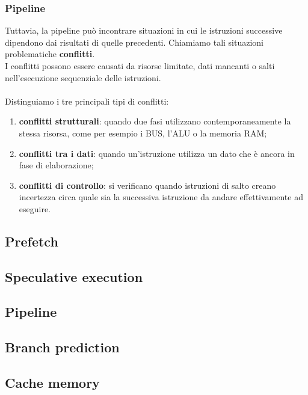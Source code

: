 \begin{frame}
	\frametitle{ Pipeline}

		Tuttavia, la pipeline può incontrare situazioni in cui le istruzioni successive dipendono dai risultati di quelle precedenti. Chiamiamo tali situazioni problematiche \textbf{conflitti}.\\
		I conflitti possono essere causati da risorse limitate, dati mancanti o salti nell'esecuzione sequenziale delle istruzioni.\\~\\		
		Distinguiamo i tre principali tipi di conflitti:
		\begin{enumerate}
			\item \textbf{conflitti strutturali}: quando due fasi utilizzano contemporaneamente la stessa risorsa, come per esempio i BUS, l’ALU o la memoria RAM;
			\item \textbf{conflitti tra i dati}: quando un'istruzione utilizza un dato che è ancora in fase di elaborazione;
			\item \textbf{conflitti di controllo}: si verificano quando istruzioni di salto creano incertezza circa quale sia la successiva istruzione da andare effettivamente ad eseguire.
		\end{enumerate}
		

\end{frame}






\subsection[Prefetch]{Prefetch}
\subsection[Speculative execution]{Speculative execution}
\subsection[Pipeline]{Pipeline}
\subsection[Branch prediction]{Branch prediction}
\subsection[Cache memory]{Cache memory}
